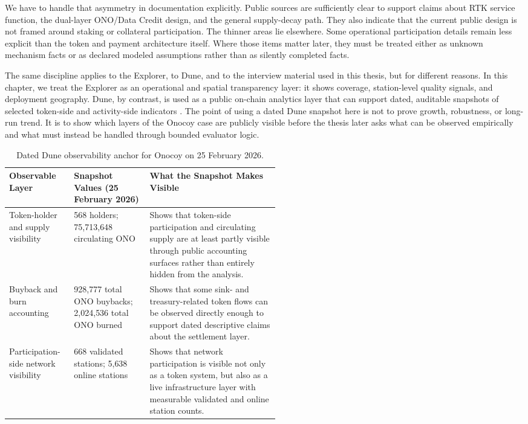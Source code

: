 We have to handle that asymmetry in documentation explicitly. Public sources are sufficiently clear to support claims about RTK service function, the dual-layer ONO/Data Credit design, and the general supply-decay path. They also indicate that the current public design is not framed around staking or collateral participation. The thinner areas lie elsewhere. Some operational participation details remain less explicit than the token and payment architecture itself. Where those items matter later, they must be treated either as unknown mechanism facts or as declared modeled assumptions rather than as silently completed facts.

The same discipline applies to the Explorer, to Dune, and to the interview material used in this thesis, but for different reasons. In this chapter, we treat the Explorer as an operational and spatial transparency layer: it shows coverage, station-level quality signals, and deployment geography. Dune, by contrast, is used as a public on-chain analytics layer that can support dated, auditable snapshots of selected token-side and activity-side indicators \cite{OnocoyExplorer, OnocoyDuneDashboard}. The point of using a dated Dune snapshot here is not to prove growth, robustness, or long-run trend. It is to show which layers of the Onocoy case are publicly visible before the thesis later asks what can be observed empirically and what must instead be handled through bounded evaluator logic.

\begin{table}[H]
    \centering
    \small
    \renewcommand{\arraystretch}{1.2}
    \begin{tabularx}{\textwidth}{@{}>{\raggedright\arraybackslash}p{0.24\linewidth}>{\raggedright\arraybackslash}p{0.28\linewidth}X@{}}
        \toprule
        \textbf{Observable Layer} & \textbf{Snapshot Values (25 February 2026)} & \textbf{What the Snapshot Makes Visible} \\
        \midrule
        Token-holder and supply visibility & 1{,}568 holders; 75{,}713{,}648 circulating ONO & Shows that token-side participation and circulating supply are at least partly visible through public accounting surfaces rather than entirely hidden from the analysis. \\
        \midrule
        Buyback and burn accounting & 2{,}928{,}777 total ONO buybacks; 2{,}024{,}536 total ONO burned & Shows that some sink- and treasury-related token flows can be observed directly enough to support dated descriptive claims about the settlement layer. \\
        \midrule
        Participation-side network visibility & 7{,}668 validated stations; 5{,}638 online stations & Shows that network participation is visible not only as a token system, but also as a live infrastructure layer with measurable validated and online station counts. \\
        \bottomrule
    \end{tabularx}
    \caption[Onocoy Dune observability anchor]{Dated Dune observability anchor for Onocoy on 25 February 2026.}
    \label{tab:v2_onocoy_dune_anchor}
\end{table}

